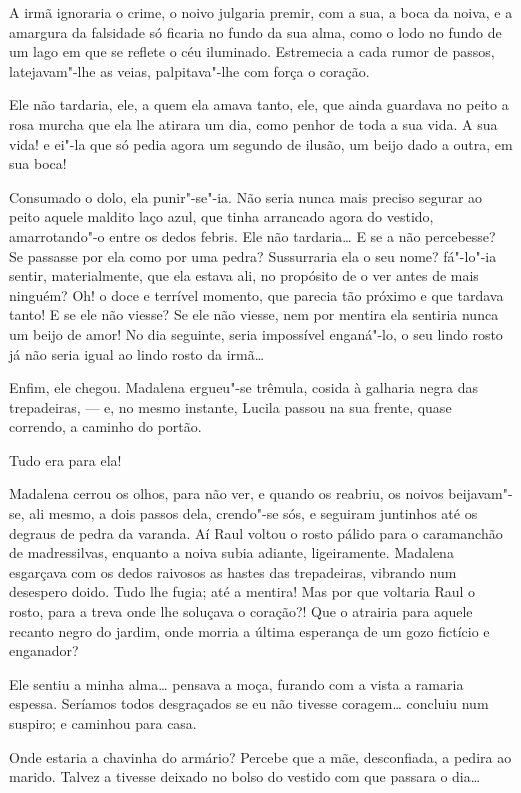 A irmã ignoraria o crime, o noivo julgaria premir, com a sua, a boca da
noiva, e a amargura da falsidade só ficaria no fundo da sua alma, como o
lodo no fundo de um lago em que se reflete o céu iluminado. Estremecia a
cada rumor de passos, latejavam"-lhe as veias, palpitava"-lhe com força o
coração.

Ele não tardaria, ele, a quem ela amava tanto, ele, que ainda guardava
no peito a rosa murcha que ela lhe atirara um dia, como penhor de toda a
sua vida. A sua vida! e ei"-la que só pedia agora um segundo de ilusão,
um beijo dado a outra, em sua boca!

Consumado o dolo, ela punir"-se"-ia. Não seria nunca mais preciso segurar
ao peito aquele maldito laço azul, que tinha arrancado agora do vestido,
amarrotando"-o entre os dedos febris. Ele não tardaria\ldots{} E se a não
percebesse? Se passasse por ela como por uma pedra? Sussurraria ela o
seu nome? fá"-lo"-ia sentir, materialmente, que ela estava ali, no
propósito de o ver antes de mais ninguém? Oh! o doce e terrível momento,
que parecia tão próximo e que tardava tanto! E se ele não viesse? Se ele
não viesse, nem por mentira ela sentiria nunca um beijo de amor! No dia
seguinte, seria impossível enganá"-lo, o seu lindo rosto já não seria
igual ao lindo rosto da irmã\ldots{}

Enfim, ele chegou. Madalena ergueu"-se trêmula, cosida à galharia negra
das trepadeiras, --- e, no mesmo instante, Lucila passou na sua frente,
quase correndo, a caminho do portão.

Tudo era para ela!

Madalena cerrou os olhos, para não ver, e quando os reabriu, os noivos
beijavam"-se, ali mesmo, a dois passos dela, crendo"-se sós, e seguiram
juntinhos até os degraus de pedra da varanda. Aí Raul voltou o rosto
pálido para o caramanchão de madressilvas, enquanto a noiva subia
adiante, ligeiramente. Madalena esgarçava com os dedos raivosos as
hastes das trepadeiras, vibrando num desespero doido. Tudo lhe fugia;
até a mentira! Mas por que voltaria Raul o rosto, para a treva onde lhe
soluçava o coração?! Que o atrairia para aquele recanto negro do jardim,
onde morria a última esperança de um gozo fictício e enganador?

Ele sentiu a minha alma\ldots{} pensava a moça, furando com a vista a ramaria
espessa. Seríamos todos desgraçados se eu não tivesse coragem\ldots{}
concluiu num suspiro; e caminhou para casa.

Onde estaria a chavinha do armário? Percebe que a mãe, desconfiada, a
pedira ao marido. Talvez a tivesse deixado no bolso do vestido com que
passara o dia\ldots{}


